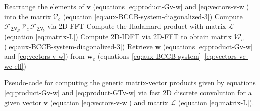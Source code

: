 \begin{algorithm}
	Rearrange the elements of $\mathbf{v}$ (equations \ref{eq:product-Gv-w} and \ref{eq:vectors-v-w}) into the 
	matrix $\boldsymbol{\mathcal{V}}_{c}$ (equation \ref{eq:aux-BCCB-system-diagonalized-3})\; 
	Compute $\boldsymbol{\mathcal{F}}_{2N_{B}} \, \boldsymbol{\mathcal{V}}_{c} \, \boldsymbol{\mathcal{F}}_{2N_{b}}$ via 2D-FFT\;
	Compute the Hadamard product with matrix $\boldsymbol{\mathcal{L}}$ (equation \ref{eq:matrix-L})\;
	Compute 2D-IDFT via 2D-FFT to obtain matrix $\boldsymbol{\mathcal{W}}_{c}$ (\ref{eq:aux-BCCB-system-diagonalized-3})\;
	Retrieve $\mathbf{w}$ (equations \ref{eq:product-Gv-w} and \ref{eq:vectors-v-w}) from $\mathbf{w}_{c}$
	(equations \ref{eq:aux-BCCB-system}--\ref{eq:vectors-vc-wc-ell})\;
	\caption{Pseudo-code for computing the generic matrix-vector products given by equations \ref{eq:product-Gv-w} 
		and \ref{eq:product-GTv-w} via fast 2D discrete convolution for a given vector $\mathbf{v}$ (equation \ref{eq:vectors-v-w}) 
		and matrix $\boldsymbol{\mathcal{L}}$ (equation \ref{eq:matrix-L}).}
	\label{alg:fast-2D-convolution}
\end{algorithm}